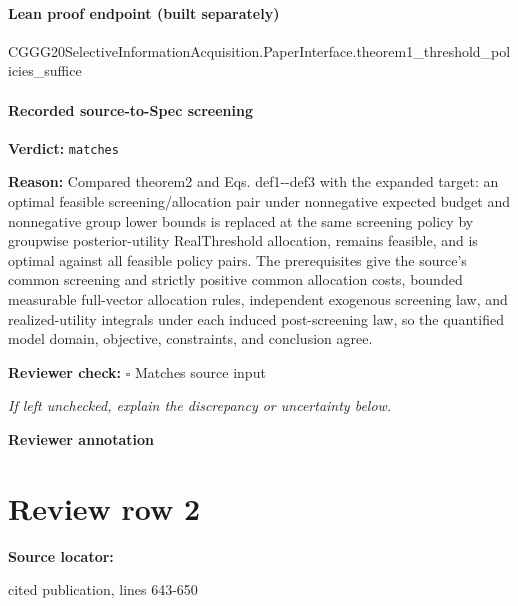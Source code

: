 \documentclass[10pt]{article}
\newcommand{\reviewerbox}{%
  \par\noindent\fbox{\parbox{0.96\linewidth}{\rule{0pt}{0.38in}}}\par
}
\newcommand{\reviewmatch}[1]{%
  \par\noindent\textbf{Reviewer check:} $\square$\; #1\par
  \noindent\emph{If left unchecked, explain the discrepancy or uncertainty below.}\par
}
\begin{document}
\paragraph{Lean proof endpoint (built separately)}\begin{ReviewVerbatim}
CGGG20SelectiveInformationAcquisition.PaperInterface.theorem1_threshold_policies_suffice
\end{ReviewVerbatim}

\paragraph{Recorded source-to-Spec screening}
\textbf{Verdict:} \texttt{matches}
\\
{\raggedright
\textbf{Reason:} Compared theorem2 and Eqs.\allowbreak{} def1-\allowbreak{}-\allowbreak{}def3 with the expanded target:\allowbreak{} an optimal feasible screening/\allowbreak{}allocation pair under nonnegative expected budget and nonnegative group lower bounds is replaced at the same screening policy by groupwise posterior-\allowbreak{}utility RealThreshold allocation, remains feasible, and is optimal against all feasible policy pairs.\allowbreak{} The prerequisites give the source's common screening and strictly positive common allocation costs, bounded measurable full-\allowbreak{}vector allocation rules, independent exogenous screening law, and realized-\allowbreak{}utility integrals under each induced post-\allowbreak{}screening law, so the quantified model domain, objective, constraints, and conclusion agree.\allowbreak{}
\par}
\reviewmatch{Matches source input}
\noindent\textbf{Reviewer annotation}\par
\reviewerbox
\clearpage
\hypertarget{source-claim-40312256d65f8a1e}{}
\section*{Review row 2}
\textbf{Source locator:} {\footnotesize\raggedright cited publication, lines 643-\allowbreak{}650\par}
\end{document}
